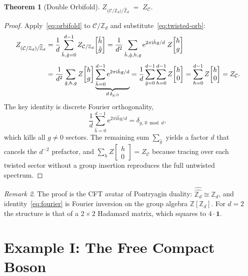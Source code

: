 \documentclass[11pt,a4paper]{article}
\theoremstyle{plain}
\newtheorem{theorem}{Theorem}[section]
\theoremstyle{definition}
\theoremstyle{remark}
\newtheorem{remark}[theorem]{Remark}
\newcommand{\ZZ}{\mathbb{Z}}
\newcommand{\Zd}{\mathbb{Z}_d}
\newcommand{\Zhat}{\widehat{\mathbb{Z}}_d}
\newcommand{\Cft}{\mathcal{C}}
\newcommand{\ii}{\mathrm{i}}
\newcommand{\ee}{\mathrm{e}}
\newcommand{\partfn}[2]{Z\!\begin{bmatrix}#1\\#2\end{bmatrix}}
\begin{document}
\begin{theorem}[Double Orbifold]\label{thm:main}
  $\displaystyle Z_{\bigl(\Cft/\Zd\bigr)/\Zhat} \;=\; Z_{\Cft}.$
\end{theorem}

\begin{proof}
Apply~\eqref{eq:orbifold} to $\Cft/\Zd$ and substitute~\eqref{eq:twisted-orb}:
\begin{align}
  Z_{(\Cft/\Zd)/\Zhat}
  &= \frac{1}{d}\sum_{\hat{h},\hat{g}=0}^{d-1}
     Z_{\Cft/\Zd}\!\begin{bmatrix}\hat{h}\\\hat{g}\end{bmatrix}
  = \frac{1}{d^2}
    \sum_{\hat{h},\hat{g},h,g}
    \ee^{2\pi\ii\hat{h}g/d}\;\partfn{h}{g}
  \notag\\[4pt]
  &= \frac{1}{d^2}
    \sum_{\hat{g},h,g}
    \partfn{h}{g}
    \underbrace{\sum_{\hat{h}=0}^{d-1}\ee^{2\pi\ii\hat{h}g/d}}_{d\,\delta_{g,0}}
  = \frac{1}{d}\sum_{\hat{g}=0}^{d-1}\sum_{h=0}^{d-1}
    \partfn{h}{0}
  = \sum_{h=0}^{d-1}\partfn{h}{0}
  = Z_{\Cft}.
  \label{eq:proof}
\end{align}
The key identity is discrete Fourier orthogonality,
\begin{equation}\label{eq:fourier}
  \frac{1}{d}\sum_{\hat{h}=0}^{d-1}\ee^{2\pi\ii\hat{h}g/d} = \delta_{g,\,0\bmod d},
\end{equation}
which kills all $g\neq 0$ sectors.  The remaining sum $\sum_{\hat{g}}$
yields a factor $d$ that cancels the $d^{-2}$ prefactor, and
$\sum_h\partfn{h}{0} = Z_{\Cft}$ because tracing over each twisted
sector without a group insertion reproduces the full untwisted
spectrum.
\end{proof}

\begin{remark}
  The proof is the CFT avatar of Pontryagin duality: $\widehat{\widehat{\Zd}}\cong\Zd$,
  and identity~\eqref{eq:fourier} is Fourier inversion on the group
  algebra $\ZZ[\Zd]$.  For $d=2$ the structure is that of a $2\times 2$
  Hadamard matrix, which squares to $4\cdot\mathbf{1}$.
\end{remark}

\section{Example I: The Free Compact Boson}
\end{document}
